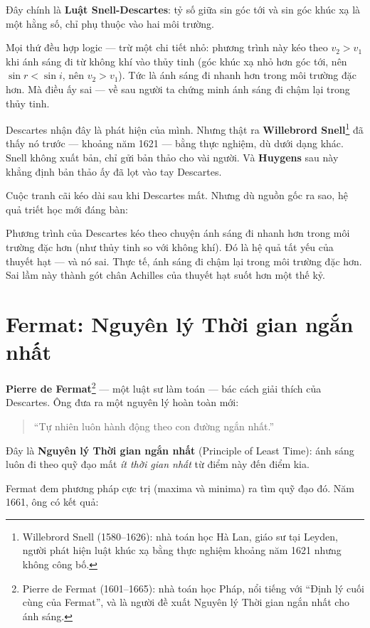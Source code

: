 Đây chính là \textbf{Luật Snell-Descartes}: tỷ số giữa sin góc tới và sin góc khúc xạ là một hằng số, chỉ phụ thuộc vào hai môi trường.

Mọi thứ đều hợp logic — trừ một chi tiết nhỏ: phương trình này kéo theo $v_2 > v_1$ khi ánh sáng đi từ không khí vào thủy tinh (góc khúc xạ nhỏ hơn góc tới, nên $\sin r < \sin i$, nên $v_2 > v_1$). Tức là ánh sáng đi nhanh hơn trong môi trường đặc hơn. Mà điều ấy sai — về sau người ta chứng minh ánh sáng đi chậm lại trong thủy tinh.

Descartes nhận đây là phát hiện của mình. Nhưng thật ra \textbf{Willebrord Snell}\footnote{Willebrord Snell (1580--1626): nhà toán học Hà Lan, giáo sư tại Leyden, người phát hiện luật khúc xạ bằng thực nghiệm khoảng năm 1621 nhưng không công bố.} đã thấy nó trước — khoảng năm 1621 — bằng thực nghiệm, dù dưới dạng khác. Snell không xuất bản, chỉ gửi bản thảo cho vài người. Và \textbf{Huygens} sau này khẳng định bản thảo ấy đã lọt vào tay Descartes.

Cuộc tranh cãi kéo dài sau khi Descartes mất. Nhưng dù nguồn gốc ra sao, hệ quả triết học mới đáng bàn:

Phương trình của Descartes kéo theo chuyện ánh sáng đi nhanh hơn trong môi trường đặc hơn (như thủy tinh so với không khí). Đó là hệ quả tất yếu của thuyết hạt — và nó sai. Thực tế, ánh sáng đi chậm lại trong môi trường đặc hơn. Sai lầm này thành gót chân Achilles của thuyết hạt suốt hơn một thế kỷ.


\section{Fermat: Nguyên lý Thời gian ngắn nhất}

\textbf{Pierre de Fermat}\footnote{Pierre de Fermat (1601--1665): nhà toán học Pháp, nổi tiếng với “Định lý cuối cùng của Fermat”, và là người đề xuất Nguyên lý Thời gian ngắn nhất cho ánh sáng.} — một luật sư làm toán — bác cách giải thích của Descartes. Ông đưa ra một nguyên lý hoàn toàn mới:

\begin{quote}
“Tự nhiên luôn hành động theo con đường ngắn nhất.”
\end{quote}

Đây là \textbf{Nguyên lý Thời gian ngắn nhất} (Principle of Least Time): ánh sáng luôn đi theo quỹ đạo mất \emph{ít thời gian nhất} từ điểm này đến điểm kia.

Fermat đem phương pháp cực trị (maxima và minima) ra tìm quỹ đạo đó. Năm 1661, ông có kết quả:

